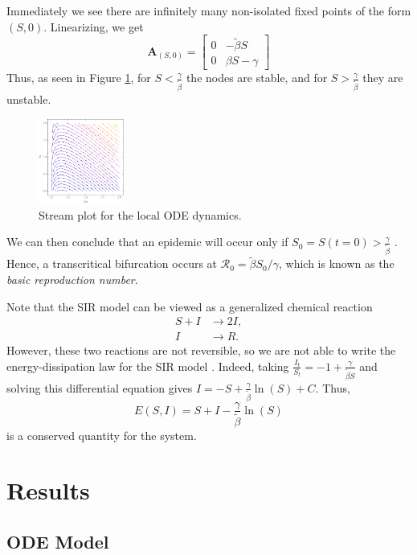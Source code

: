 \documentclass[11pt]{article}
\newcommand{\Ro}{\mathcal{R}_0}
\begin{document}
Immediately we see there are infinitely many non-isolated fixed points of the form $(S,0)$.
Linearizing, we get
\begin{equation*}
	\mathbf{A}_{(S,0)} = \begin{bmatrix} 0 & - \tilde{\beta} S \\ 0 & \beta S - \gamma \end{bmatrix}
\end{equation*}
Thus, as seen in Figure \ref{fig:localdyn}, for $S < \frac{\gamma}{\tilde{\beta}}$ the nodes are stable, and for $S > \frac{\gamma}{\tilde{\beta}}$ they are unstable.
\begin{figure}[h]
	\centering
	\includegraphics[width=0.25\textwidth]{local_dynamics}
	\caption{Stream plot for the local ODE dynamics.}
	\label{fig:localdyn}
\end{figure}
We can then conclude that an epidemic will occur only if $S_0 = S(t=0) > \frac{\gamma}{\tilde{\beta}}$ \cite{Wang_SIR}.
Hence, a transcritical bifurcation occurs at $\Ro = \tilde{\beta} S_0 / \gamma$, which is known as the \textit{basic reproduction number}.

Note that the SIR model can be viewed as a generalized chemical reaction
\begin{align*}
	S + I	&\longrightarrow	2 I, \\
	I		&\longrightarrow	R.
\end{align*}
However, these two reactions are not reversible, so we are not able to write the energy-dissipation law for the SIR model \cite{Forster_2013, Wang_2020}.
Indeed, taking $\frac{I_t}{S_t} = - 1 + \frac{\gamma}{\tilde{\beta} S}$ and solving this differential equation gives $I = - S + \frac{\gamma}{\tilde{\beta}} \ln(S) + C$.
Thus,
\begin{equation}
	E(S,I) = S + I - \frac{\gamma}{\tilde{\beta}} \ln(S)
\end{equation}
is a conserved quantity for the system.

\section{Results}
\subsection{ODE Model}
\end{document}
